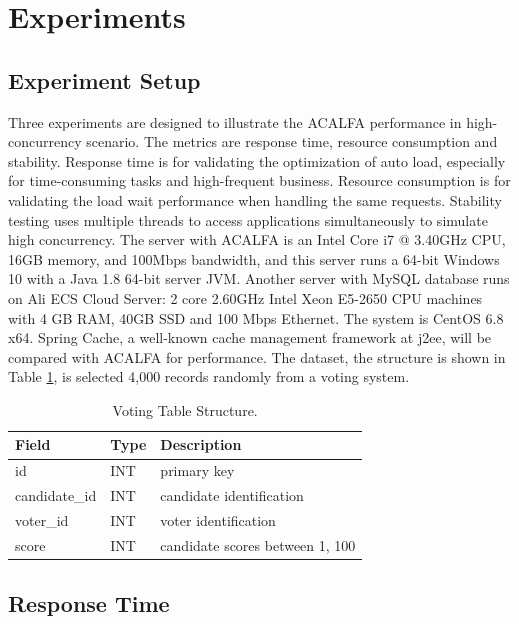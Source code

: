 \documentclass{singlecol-new}
\theoremstyle{TH}{
\newtheorem{lemma}{Lemma}
\newtheorem{theorem}[lemma]{Theorem}
\newtheorem{corrolary}[lemma]{Corrolary}
\newtheorem{conjecture}[lemma]{Conjecture}
\newtheorem{proposition}[lemma]{Proposition}
\newtheorem{claim}[lemma]{Claim}
\newtheorem{stheorem}[lemma]{Wrong Theorem}
}
\theoremstyle{THrm}{
\newtheorem{definition}{Definition}[section]
\newtheorem{question}{Question}[section]
\newtheorem{remark}{Remark}
\newtheorem{scheme}{Scheme}
}
\theoremstyle{THhit}{
\newtheorem{case}{Case}[section]
}
\begin{document}
\section{Experiments}
\label{Experiments}

\subsection{Experiment Setup}
Three experiments are designed to illustrate the ACALFA performance in high-concurrency scenario. The metrics are response time, resource consumption and stability. Response time is for validating the optimization of auto load, especially for time-consuming tasks and high-frequent business. Resource consumption is for validating the load wait performance when handling the same requests. Stability testing uses multiple threads to access applications simultaneously to simulate high concurrency. The server with ACALFA is an Intel Core i7 @ 3.40GHz CPU, 16GB memory, and 100Mbps bandwidth, and this server runs a 64-bit Windows 10 with a Java 1.8 64-bit server JVM. Another server with MySQL database runs on Ali ECS Cloud Server: 2 core 2.60GHz Intel Xeon E5-2650 CPU machines with 4 GB RAM, 40GB SSD and 100 Mbps Ethernet. The system is CentOS 6.8 x64. Spring Cache, a well-known cache management framework at j2ee, will be compared with ACALFA for performance. The dataset, the structure is shown in Table \ref{VTS}, is selected 4,000 records randomly from a voting system.

\begin{table}[htb]
\begin{center}
 \caption{\label{VTS}Voting Table Structure.}
 \begin{tabular}{lll}
 \toprule
    Field & Type & Description\\
 \midrule
    id & INT & primary key\\
    candidate\_id & INT & candidate identification\\
    voter\_id & INT & voter identification\\
    score & INT & candidate scores between 1, 100\\
\bottomrule
 \end{tabular}
\end{center}
\end{table}

\subsection{Response Time}
\end{document}
